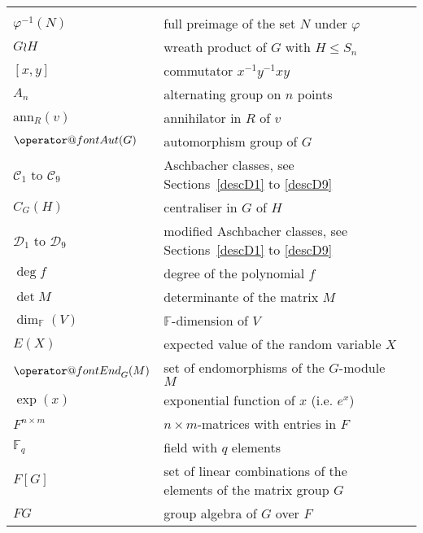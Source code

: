 \documentclass[openany,11pt,british]{book}
\makeatletter
\newcommand{\maop}[1]{%
\ensuremath{\mathop{\operator@font #1}\nolimits}}
\newcommand{\End}{\maop{End}}
\newcommand{\ann}{\mathrm{ann}}
\newcommand{\Aut}{\maop{Aut}}
\newcommand{\F}{\ensuremath{\mathbb{F}}}
\newcommand{\CC}[1]{\ensuremath{\mathcal{C}_{#1}}}
\newcommand{\DD}[1]{\ensuremath{\mathcal{D}_{#1}}}
\theoremstyle{changebreak}
\makeatother
\begin{document}
\begin{longtable}{|lll|}
                        & \\
$\varphi^{-1}(N)$       & full preimage of the set $N$ under $\varphi$
                        & \\
$G \wr H$               & wreath product of $G$ with $H \le S_n$
                        & \\
$[x,y]$                 & commutator $x^{-1}y^{-1}xy$
                        & \\
$A_n$                   & alternating group on $n$ points
                        & \\
$\ann_R(v)$             & annihilator in $R$ of $v$
                        & \\
$\Aut(G)$               & automorphism group of $G$
                        & \\
$\CC1$ to $\CC9$        & Aschbacher classes, see Sections~\ref{descD1} to
                          \ref{descD9} 
                        & \\
$C_G(H)$                & centraliser in $G$ of $H$
                        & \\
$\DD1$ to $\DD9$        & modified Aschbacher classes, see 
                          Sections~\ref{descD1} to \ref{descD9} 
                        & \\
$\deg f$                & degree of the polynomial $f$
                        & \\
$\det M$                & determinante of the matrix $M$
                        & \\
$\dim_{\F}(V)$          & $\F$-dimension of $V$
                        & \\
$E(X)$                  & expected value of the random variable $X$
                        & \\
$\End_G(M)$             & set of endomorphisms of the $G$-module $M$
                        & \\
$\exp(x)$               & exponential function of $x$ (i.e. $e^x$)
                        & \\
$F^{n \times m}$        & $n \times m$-matrices with entries in $F$
                        & \\
$\F_q$                  & field with $q$ elements
                        & \\
$F[G]$                  & set of linear combinations of the elements of
                          the matrix group $G$
                        & \\
$FG$                    & group algebra of $G$ over $F$

\end{longtable}
\end{document}
